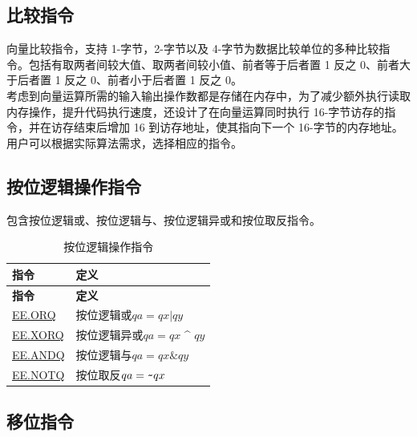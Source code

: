 \documentclass[main\_\_CN.tex]{subfiles}
\begin{document}
\subsection{比较指令}
\label{sec:pie-comparison-instrucitons}

向量比较指令，支持 1-字节，2-字节以及 4-字节为数据比较单位的多种比较指令。包括有取两者间较大值、取两者间较小值、前者等于后者置 1 反之 0、前者大于后者置 1 反之 0、前者小于后者置 1 反之 0。\\
考虑到向量运算所需的输入输出操作数都是存储在内存中，为了减少额外执行读取内存操作，提升代码执行速度，还设计了在向量运算同时执行 16-字节访存的指令，并在访存结束后增加 16 到访存地址，使其指向下一个 16-字节的内存地址。用户可以根据实际算法需求，选择相应的指令。\\




\subsection{按位逻辑操作指令}\label{sec:pie-bitwise-logic-instrucitons}

包含按位逻辑或、按位逻辑与、按位逻辑异或和按位取反指令。

\begin{longtable}[c]{|l|m{10cm}|}
    \caption{按位逻辑操作指令}
    \label{tab:pie-bitwise-logic-instructions}\\
    \hline
    \rowcolor{lightgray}
    \textbf{指令} & \textbf{定义} \\\hline
    \endfirsthead
    \rowcolor{lightgray}
    \textbf{指令} & \textbf{定义} \\\hline
    \endhead
    \endfoot

    \hyperref[instruction:EEORQ]{EE.ORQ} & 按位逻辑或$qa = qx | qy$
    \\\hline
    \hyperref[instruction:EEXORQ]{EE.XORQ} & 按位逻辑异或$qa = qx$ \^{} $qy$
    \\\hline
    \hyperref[instruction:EEANDQ]{EE.ANDQ} & 按位逻辑与$qa = qx \& qy$
    \\\hline
    \hyperref[instruction:EENOTQ]{EE.NOTQ} & 按位取反$qa =\verb+~+ qx$
    \\\hline
\end{longtable}


\subsection{移位指令}
\end{document}

